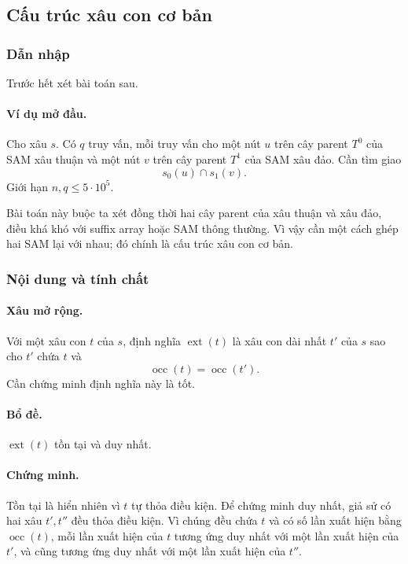\documentclass[11pt]{article}
\begin{document}
\subsection{Cấu trúc xâu con cơ bản}

\subsubsection{Dẫn nhập}

Trước hết xét bài toán sau.

\paragraph{Ví dụ mở đầu.}
Cho xâu \(s\). Có \(q\) truy vấn, mỗi truy vấn cho một nút \(u\) trên cây
parent \(T^0\) của SAM xâu thuận và một nút \(v\) trên cây parent \(T^1\) của
SAM xâu đảo. Cần tìm giao
\[
  s_0(u)\cap s_1(v).
\]
Giới hạn \(n,q\le 5\cdot 10^5\).

Bài toán này buộc ta xét đồng thời hai cây parent của xâu thuận và xâu đảo,
điều khá khó với suffix array hoặc SAM thông thường. Vì vậy cần một cách ghép
hai SAM lại với nhau; đó chính là cấu trúc xâu con cơ bản.

\subsubsection{Nội dung và tính chất}

\paragraph{Xâu mở rộng.}
Với một xâu con \(t\) của \(s\), định nghĩa \(\operatorname{ext}(t)\) là xâu
con dài nhất \(t'\) của \(s\) sao cho \(t'\) chứa \(t\) và
\[
  \operatorname{occ}(t)=\operatorname{occ}(t').
\]
Cần chứng minh định nghĩa này là tốt.

\paragraph{Bổ đề.}
\(\operatorname{ext}(t)\) tồn tại và duy nhất.

\paragraph{Chứng minh.}
Tồn tại là hiển nhiên vì \(t\) tự thỏa điều kiện. Để chứng minh duy nhất, giả
sử có hai xâu \(t',t''\) đều thỏa điều kiện. Vì chúng đều chứa \(t\) và có số
lần xuất hiện bằng \(\operatorname{occ}(t)\), mỗi lần xuất hiện của \(t\) tương
ứng duy nhất với một lần xuất hiện của \(t'\), và cũng tương ứng duy nhất với
một lần xuất hiện của \(t''\).
\end{document}
